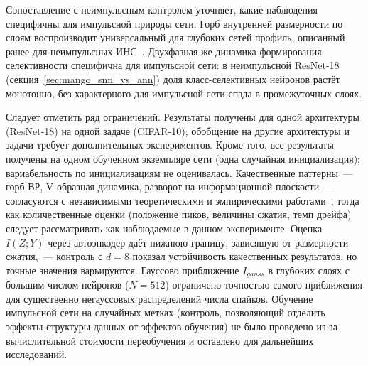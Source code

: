 Сопоставление с неимпульсным контролем уточняет, какие наблюдения специфичны для импульсной природы сети. Горб внутренней размерности по слоям воспроизводит универсальный для глубоких сетей профиль, описанный ранее для неимпульсных ИНС~\cite{Ansuini2019}. Двухфазная же динамика формирования селективности специфична для импульсной сети: в неимпульсной ResNet-18 (секция~\ref{sec:mango_snn_vs_ann}) доля класс-селективных нейронов растёт монотонно, без характерного для импульсной сети спада в промежуточных слоях.

Следует отметить ряд ограничений. Результаты получены для одной архитектуры (ResNet-18) на одной задаче (CIFAR-10); обобщение на другие архитектуры и задачи требует дополнительных экспериментов. Кроме того, все результаты получены на одном обученном экземпляре сети (одна случайная инициализация); вариабельность по инициализациям не оценивалась. Качественные паттерны~--- горб ВР, V-образная динамика, разворот на информационной плоскости~--- согласуются с независимыми теоретическими и эмпирическими работами~\cite{Ansuini2019,Recanatesi2019,Saxe2018}, тогда как количественные оценки (положение пиков, величины сжатия, темп дрейфа) следует рассматривать как наблюдаемые в данном эксперименте. Оценка $I(Z; Y)$ через автоэнкодер даёт нижнюю границу, зависящую от размерности сжатия,~--- контроль с $d = 8$ показал устойчивость качественных результатов, но точные значения варьируются. Гауссово приближение $I_{gauss}$ в глубоких слоях с большим числом нейронов ($N = 512$) ограничено точностью самого приближения для существенно негауссовых распределений числа спайков. Обучение импульсной сети на случайных метках (контроль, позволяющий отделить эффекты структуры данных от эффектов обучения) не было проведено из-за вычислительной стоимости переобучения и оставлено для дальнейших исследований.
